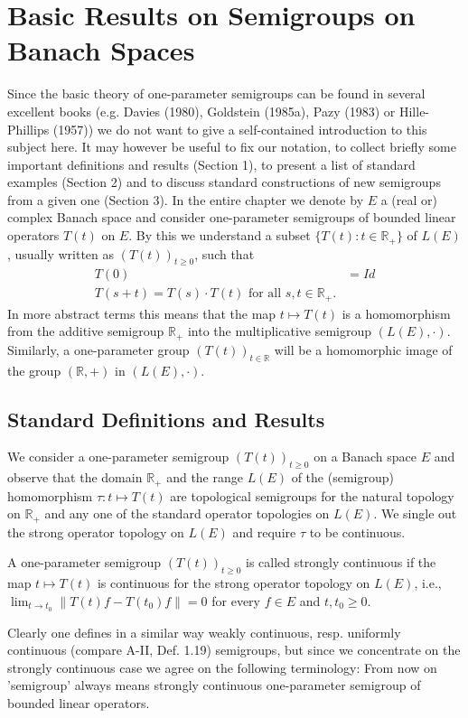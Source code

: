 \chapter{Basic Results on Semigroups on Banach Spaces}
Since the basic theory of one-parameter semigroups can be found in several excellent books (e.g. Davies (1980), Goldstein (1985a), Pazy (1983) or Hille-Phillips (1957)) we do not want to give a self-contained introduction to this subject here.
It may however be useful to fix our notation, to collect briefly some important definitions and results (Section 1), to present a list of standard examples (Section 2) and to discuss standard constructions of new semigroups from a given one (Section 3).
In the entire chapter we denote by $E$ a (real or) complex Banach space and consider one-parameter semigroups of bounded linear operators $T(t)$ on $E$.
By this we understand a subset $\{T(t): t \in \mathbb{R}_{+}\}$ of $L(E)$, usually written as $(T(t))_{t \geq 0}$, such that
\begin{align*}
	T(0) &= Id \\
	T(s+t) = T(s) \cdot T(t) \text{ for all $s, t \in \mathbb{R}_{+}$.}
\end{align*}
In more abstract terms this means that the map $t \mapsto T(t)$ is a homomorphism from the additive semigroup $\mathbb{R}_{+}$ into the multiplicative semigroup $(L(E), \cdot)$.
Similarly, a one-parameter group $(T(t))_{t \in \mathbb{R}}$ will be a homomorphic image of the group $(\mathbb{R},+)$ in $(L(E), \cdot)$.
\section{Standard Definitions and Results}
We consider a one-parameter semigroup $(T(t))_{t \geq 0}$ on a Banach space $E$ and observe that the domain $\mathbb{R}_{+}$ and the range $L(E)$ of the (semigroup) homomorphism $\tau: t \mapsto T(t)$ are topological semigroups for the natural topology on $\mathbb{R}_{+}$ and any one of the standard operator topologies on $L(E)$.
We single out the strong operator topology on $L(E)$ and require $\tau$ to be continuous.
\begin{definition}
A one-parameter semigroup $(T(t))_{t \geq 0}$ is called strongly continuous if the map $t \mapsto T(t)$ is continuous for the strong operator topology on $L(E)$, i.e., $\lim_{t \to t_0} \|T(t)f - T(t_0)f\| = 0$ for every $f \in E$ and $t, t_0 \geq 0$.
\end{definition}
Clearly one defines in a similar way weakly continuous, resp. uniformly continuous (compare A-II, Def. 1.19) semigroups, but since we concentrate on the strongly continuous case we agree on the following terminology:
From now on 'semigroup' always means strongly continuous one-parameter semigroup of bounded linear operators.

